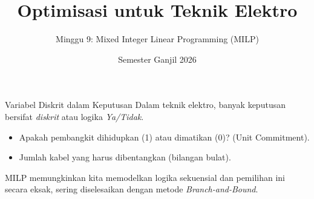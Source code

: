 \documentclass[aspectratio=169]{beamer}
\title{Optimisasi untuk Teknik Elektro}\subtitle{Minggu 9: Mixed Integer Linear Programming (MILP)}
\date{Semester Ganjil 2026}
\begin{document}
\begin{frame}\titlepage\end{frame}
\begin{frame}{Variabel Diskrit dalam Keputusan}
Dalam teknik elektro, banyak keputusan bersifat \textit{diskrit} atau logika \textit{Ya/Tidak}.
\begin{itemize}
\item Apakah pembangkit dihidupkan (1) atau dimatikan (0)? (Unit Commitment).
\item Jumlah kabel yang harus dibentangkan (bilangan bulat).
\end{itemize}
MILP memungkinkan kita memodelkan logika sekuensial dan pemilihan ini secara eksak, sering diselesaikan dengan metode \textit{Branch-and-Bound}.
\end{frame}
\end{document}
